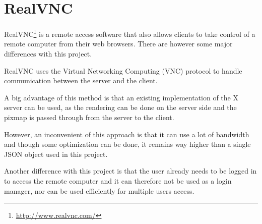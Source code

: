\section{RealVNC}
RealVNC\footnote{\url{http://www.realvnc.com/}} is a remote access software that also 
allows clients to take control of a remote computer from their web browsers. There are however some major differences with this project.

RealVNC uses the Virtual Networking Computing (VNC) protocol to handle 
communication between the server and the client.

A big advantage of this method is that an existing implementation of the X server 
can be used, as the rendering can be done on the server side and the pixmap is passed 
through from the server to the client.

However, an inconvenient of this approach is that it can use a lot of bandwidth and though 
some optimization can be done, it remains way higher than a single JSON object used in this
project.

Another difference with this project is that the user already needs to be logged in 
to access the remote computer and it can therefore not be used as a login manager, nor 
can be used efficiently for multiple users access.
